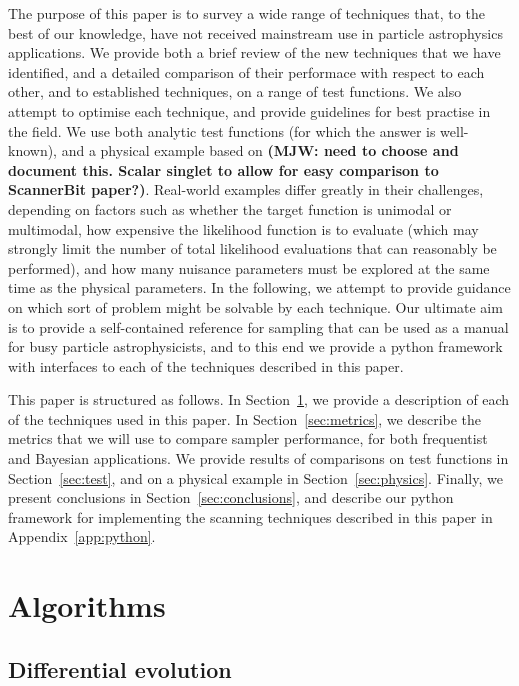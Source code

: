 \documentclass[12pt]{JHEP3}
\begin{document}
The purpose of this paper is to survey a wide range of techniques that, to the best of our knowledge, have not received mainstream use in particle astrophysics applications. We provide both a brief review of the new techniques that we have identified, and a detailed comparison of their performace with respect to each other, and to established techniques, on a range of test functions. We also attempt to optimise each technique, and provide guidelines for best practise in the field. We use both analytic test functions (for which the answer is well-known), and a physical example based on {\bf (MJW: need to choose and document this. Scalar singlet to allow for easy comparison to ScannerBit paper?)}. Real-world examples differ greatly in their challenges, depending on factors such as whether the target function is unimodal or multimodal, how expensive the likelihood function is to evaluate (which may strongly limit the number of total likelihood evaluations that can reasonably be performed), and how many nuisance parameters must be explored at the same time as the physical parameters. In the following, we attempt to provide guidance on which sort of problem might be solvable by each technique. Our ultimate aim is to provide a self-contained reference for sampling that can be used as a manual for busy particle astrophysicists, and to this end we provide a python framework with interfaces to each of the techniques described in this paper.

This paper is structured as follows. In Section~\ref{sec:algorithms}, we provide a description of each of the techniques used in this paper. In Section~\ref{sec:metrics}, we describe the metrics that we will use to compare sampler performance, for both frequentist and Bayesian applications. We provide results of comparisons on test functions in Section~\ref{sec:test}, and on a physical example in Section~\ref{sec:physics}. Finally, we present conclusions in Section~\ref{sec:conclusions}, and describe our python framework for implementing the scanning techniques described in this paper in Appendix~\ref{app:python}.

\section{Algorithms}
\label{sec:algorithms}

\subsection{Differential evolution}
\end{document}

